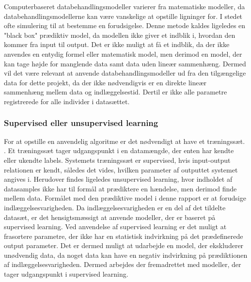 Computerbaseret databehandlingsmodeller varierer fra matematiske modeller, da databehandlingsmodellerne kan være vanskelige at opstille ligninger for. I stedet ofte simulering til at bestemme en forudsigelse. Denne metode kaldes ligeledes en "black box" prædiktiv model, da modellen ikke giver et indblik i, hvordan den kommer fra input til output. Det er ikke muligt at få et indblik, da der ikke anvendes en entydig formel eller matematisk model, men derimod en model, der kan tage højde for manglende data samt data uden lineær sammenhæng. Dermed vil det være relevant at anvende databehandlingsmodeller ud fra den tilgængelige data for dette projekt, da der ikke nødvendigvis er en direkte lineær sammenhæng mellem data og indlæggelsestid. Dertil er ikke alle parametre registrerede for alle individer i datasættet. \cite{Kuhn2013}


\subsubsection{Supervised eller unsupervised learning}
For at opstille en anvendelig algoritme er det nødvendigt at have et træningssæt. 
\cite{DIKU2010}. Et træningssæt tager udgangspunkt i en datamængde, der enten har kendte eller ukendte labels. Systemets træningssæt er supervised, hvis input-output relationen er kendt, således det vides, hvilken parameter af outputtet systemet angives i. \cite{Brownlee2013} Herudover findes ligeledes unsupervised learning, hvor indholdet af datasamples ikke har til formål at prædiktere en hændelse, men derimod finde mellem data.\cite{Brownlee2013, Kuhn2013} Formålet med den prædiktive model i denne rapport er at forudsige indlæggelsesvarigheden. Da indlæggelsesvarigheden er en del af det tildelte datasæt, er det hensigtsmæssigt at anvende modeller, der er baseret på supervised learning. Ved anvendelse af supervised learning er det muligt at frasortere parametre, der ikke har en statistisk indvirkning på det prædefinerede output parameter. Det er dermed muligt at udarbejde en model, der ekskluderer unødvendig data, da noget data kan have en negativ indvirkning på prædiktionen af indlæggelsesvarigheden. Dermed arbejdes der fremadrettet med modeller, der tager udgangspunkt i supervised learning.

